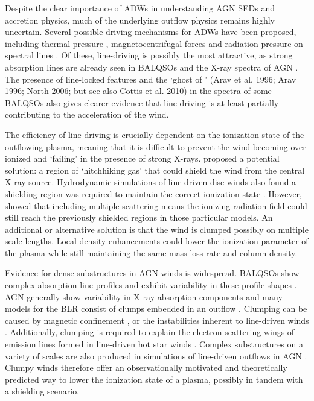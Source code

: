 \documentclass[useAMS,usenatbib]{mn2e_x}
\begin{document}
Despite the clear importance of ADWs in understanding AGN SEDs and accretion physics, 
much of the underlying outflow physics remains highly uncertain. 
Several possible driving mechanisms for ADWs have been proposed, including
thermal pressure \citep{weymann1982, begelman1991}, magnetocentrifugal forces 
\citep{blandfordpayne,pelletier_pudritz} and 
radiation pressure on spectral lines \citep[`line-driving';][]{lucysolomon1970,shlosman1985,MCGV95}.
Of these, line-driving is possibly the most attractive, as
strong absorption lines are already seen in BALQSOs and the X-ray spectra of AGN 
\citep{reeves2003,poundsreeves2009,tombesi2010a}.
The presence of line-locked features \citep{bowler2014} 
and the `ghost of \la' (Arav et al. 1996; Arav 1996; North 2006; but see 
also Cottis et al. 2010) \nocite{arav1995, arav1996, north2006,cottis2010}
in the spectra of some BALQSOs also gives clearer evidence that line-driving is
at least partially contributing to the acceleration of the wind.

The efficiency of line-driving is crucially dependent on the ionization state 
of the outflowing plasma, meaning that it is difficult to prevent 
the wind becoming over-ionized and `failing' in the presence of strong X-rays. 
\cite{MCGV95} proposed a potential solution: 
a region of `hitchhiking gas' that could shield the wind from the central X-ray source. 
Hydrodynamic simulations of line-driven disc winds also found a shielding region
was required to maintain the correct ionization state \citep{PSK2000,PK04}. 
However, \cite{H14} showed that including multiple scattering means the ionizing radiation 
field could still reach the previously shielded regions in those particular models.
An additional or alternative solution is that the wind is clumped \citep[e.g.][]{hamann2013}
possibly on multiple scale lengths. Local density enhancements could lower the 
ionization parameter of the plasma while still maintaining the same mass-loss 
rate and column density. 

Evidence for dense substructures in AGN winds is widespread.
BALQSOs show complex absorption line profiles \citep{ganguly2006, simonhamann2010}
and exhibit variability in these profile shapes \citep{capellupo2011,capellupo2012,capellupo2014}.
AGN generally show variability in X-ray absorption components \citep[e.g.][]{risaliti2002}
and many models for the BLR consist of clumps embedded in an outflow 
\citep{krolik1981, emmering1992, dekool1995, cassidyraine1996}.
Clumping can be caused by magnetic confinement \cite{dekool1995},
or the instabilities inherent to line-driven winds 
\citep{lucysolomon1970,macgregor1979,carlberg1980,owockirybicki1984,owockirybicki1985}.
Additionally, clumping is required to explain the electron scattering wings of emission lines formed
in line-driven hot star winds \citep{hillier1991eswingsmodel}. Complex substructures 
on a variety of scales are also produced in simulations of line-driven 
outflows in AGN \citep{PSK2000,PK04,progakurosawa2010,proga2014}.
Clumpy winds therefore offer an observationally motivated and theoretically 
predicted way to lower the ionization state of a plasma, possibly in tandem
with a shielding scenario. 
\end{document}
